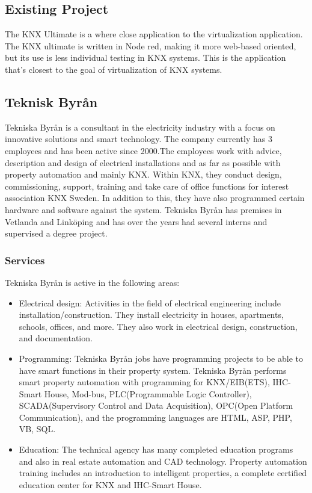 \documentclass{article}
\begin{document}
\subsection{Existing Project}
The KNX Ultimate is a where close application to the virtualization application. The KNX ultimate is written in Node red, making it more web-based oriented, but its use is less individual testing in KNX systems. This is the application that's closest to the goal of virtualization of KNX systems. 
\subsection{Teknisk Byrån}
Tekniska Byrån is a consultant in the electricity industry with a focus on innovative solutions and smart technology. The company currently has 3 employees and has been active since 2000.The employees work with advice, description and design of electrical installations and as far as possible with property automation and mainly KNX. Within KNX, they conduct design, commissioning, support, training and take care of office functions for interest association KNX Sweden. In addition to this, they have also programmed certain hardware and software against the system. Tekniska Byrån has premises in Vetlanda and Linköping and has over the years had several interns and supervised a degree project.\cite{tekAbout} 






\subsubsection{Services}
Tekniska Byrån is active in the following areas:
\begin{itemize}
    \item Electrical design: Activities in the field of electrical engineering include installation/construction. They install electricity in houses, apartments, schools, offices, and more. They also work in electrical design, construction, and documentation.\cite{tekelproj} 
    \item Programming: Tekniska Byrån jobs have programming projects to be able to have 
    smart functions in their property system. Tekniska Byrån performs smart property automation with programming for
 KNX/EIB(ETS), IHC-Smart House, Mod-bus, PLC(Programmable Logic Controller), 
 SCADA(Supervisory Control and Data Acquisition), OPC(Open Platform Communication),
 and the programming languages are HTML, ASP, PHP, VB, SQL.\cite{tekprog} 
    \item Education: The technical agency has many completed education programs and also in real estate automation and CAD technology. Property automation training includes an introduction to intelligent properties, a complete certified education center for KNX and IHC-Smart House.\cite{tekut} 
\end{itemize}
\end{document}
